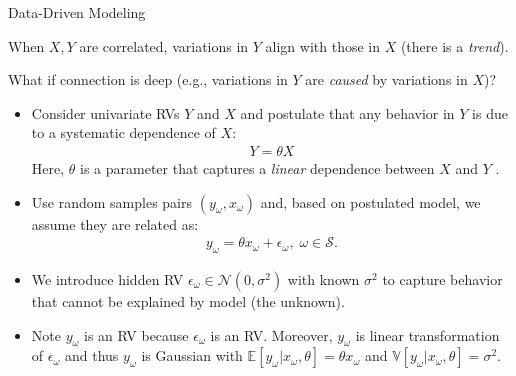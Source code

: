 \documentclass[9pt]{beamer}
\begin{document}
%
\begin{frame}{Data-Driven Modeling}

When $X,Y$ are correlated, variations in $Y$ align with those in $X$ (there is a {\em trend}). 
\begin{block}{}
What if connection is deep (e.g., variations in $Y$ are {\em caused} by variations in $X$)? 
\end{block}

\begin{itemize}

\item Consider univariate RVs $Y$ and $X$ and postulate that any behavior in $Y$ is due to a systematic dependence of $X$:
\begin{align*}
Y=\theta X
\end{align*}
Here, $\theta$ is a parameter that captures a {\em linear} dependence between $X$ and $Y$ . 

\item Use random samples pairs $(y_\omega,x_\omega)$ and, based on postulated model, we assume they are related as:
\begin{align*}
y_\omega=\theta x_\omega + \epsilon_\omega,\; \omega \in \mathcal{S}.
\end{align*}
\item We introduce hidden RV $\epsilon_\omega\in \mathcal{N}(0,\sigma^2)$ with known $\sigma^2$ to capture behavior that cannot be explained by model (the unknown).  

\item  Note $y_\omega$ is an RV because $\epsilon_\omega$ is an RV. Moreover, $y_\omega$ is linear transformation of $\epsilon_\omega$ and thus $y_\omega$ is Gaussian with $\mathbb{E}[y_\omega|x_\omega,\theta]=\theta x_\omega$ and  $\mathbb{V}[y_\omega|x_\omega,\theta]=\sigma^2$. 

\end{itemize}

\end{frame}
\end{document}
